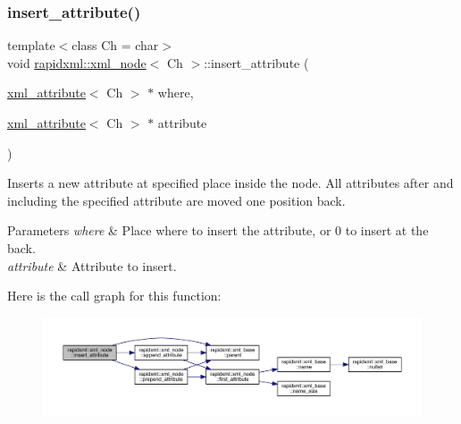 \subsubsection{\texorpdfstring{insert\_attribute()}{insert\_attribute()}}
{\footnotesize\ttfamily template$<$class Ch = char$>$ \\
void \mbox{\hyperlink{classrapidxml_1_1xml__node}{rapidxml\+::xml\+\_\+node}}$<$ Ch $>$\+::insert\+\_\+attribute (\begin{DoxyParamCaption}\item[{\mbox{\hyperlink{classrapidxml_1_1xml__attribute}{xml\+\_\+attribute}}$<$ Ch $>$ $\ast$}]{where,  }\item[{\mbox{\hyperlink{classrapidxml_1_1xml__attribute}{xml\+\_\+attribute}}$<$ Ch $>$ $\ast$}]{attribute }\end{DoxyParamCaption})\hspace{0.3cm}{\ttfamily [inline]}}

Inserts a new attribute at specified place inside the node. All attributes after and including the specified attribute are moved one position back.
\begin{DoxyParams}{Parameters}
{\em where} & Place where to insert the attribute, or 0 to insert at the back.\\
\hline
{\em attribute} & Attribute to insert. \\
\hline
\end{DoxyParams}
Here is the call graph for this function\+:\nopagebreak
\begin{figure}[H]
\begin{center}
\leavevmode
\includegraphics[width=350pt]{classrapidxml_1_1xml__node_a9fe659cdf4a5b3bbf5e8ffc98db5a84f_cgraph}
\end{center}
\end{figure}
\mbox{\label{classrapidxml_1_1xml__node_a666880f42a7e486d78cc45ed51c7c46d}} 

